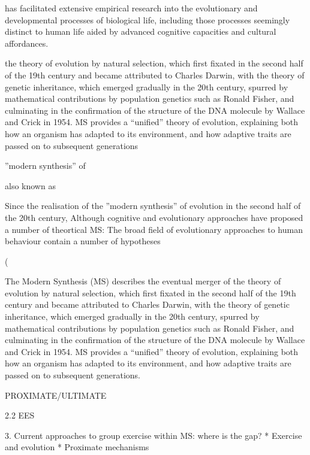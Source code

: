  has facilitated extensive empirical research into the evolutionary and developmental processes of biological life, including those processes seemingly distinct to human life aided by advanced cognitive capacities and cultural affordances.

the theory of evolution by natural selection, which first fixated in the second half of the 19th century and became attributed to Charles Darwin, with the theory of genetic inheritance, which emerged gradually in the 20th century, spurred by mathematical contributions by population genetics such as Ronald Fisher, and culminating in the confirmation of the structure of the DNA molecule by Wallace and Crick in 1954.  MS provides a ``unified'' theory of evolution, explaining both how an organism has adapted to its environment, and how adaptive traits are passed on to subsequent generations




 ''modern synthesis'' of

also known as

Since the realisation of the ''modern synthesis'' of evolution in the second half of the 20th century,
Although cognitive and evolutionary approaches have proposed a number of theortical
MS:
The broad field of evolutionary approaches to human behaviour contain a number of hypotheses

 (


The Modern Synthesis (MS) describes the eventual merger of the theory of evolution by natural selection, which first fixated in the second half of the 19th century and became attributed to Charles Darwin, with the theory of genetic inheritance, which emerged gradually in the 20th century, spurred by mathematical contributions by population genetics such as Ronald Fisher, and culminating in the confirmation of the structure of the DNA molecule by Wallace and Crick in 1954.  MS provides a ``unified'' theory of evolution, explaining both how an organism has adapted to its environment, and how adaptive traits are passed on to subsequent generations.

PROXIMATE/ULTIMATE



2.2 EES









3. Current approaches to group exercise within MS: where is the gap?
* Exercise and evolution
* Proximate mechanisms

